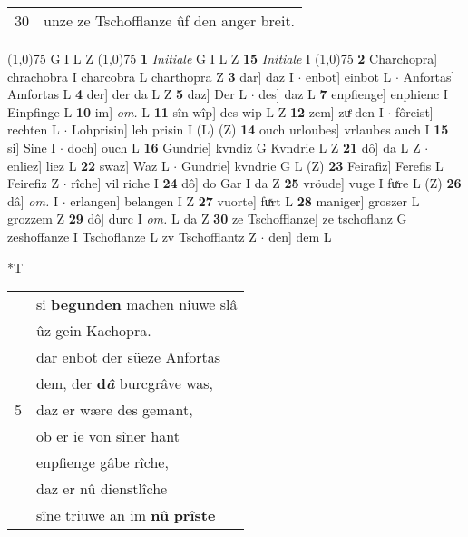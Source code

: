 \documentclass[8pt,a4paper,notitlepage]{article}
\begin{document}
\begin{table}[ht]
\begin{minipage}[t]{0.5\linewidth}
\begin{tabular}{rl}
30 & unze ze Tschofflanze ûf den anger breit.\\ 
\end{tabular}
\scriptsize
\line(1,0){75} \newline
G I L Z \newline
\line(1,0){75} \newline
\textbf{1} \textit{Initiale} G I L Z  \textbf{15} \textit{Initiale} I  \newline
\line(1,0){75} \newline
\textbf{2} Charchopra] chrachobra I charcobra L charthopra Z \textbf{3} dar] daz I  $\cdot$ enbot] einbot L  $\cdot$ Anfortas] Amfortas L \textbf{4} der] der da L Z \textbf{5} daz] Der L  $\cdot$ des] daz L \textbf{7} enpfienge] enphienc I Einpfinge L \textbf{10} im] \textit{om.} L \textbf{11} sîn wîp] des wip L Z \textbf{12} zem] zuͤ den I  $\cdot$ fôreist] rechten L  $\cdot$ Lohprisin] leh prisin I (L) (Z) \textbf{14} ouch urloubes] vrlaubes auch I \textbf{15} si] Sine I  $\cdot$ doch] ouch L \textbf{16} Gundrie] kvndiz G Kvndrie L Z \textbf{21} dô] da L Z  $\cdot$ enliez] liez L \textbf{22} swaz] Waz L  $\cdot$ Gundrie] kvndrie G L (Z) \textbf{23} Feirafiz] Ferefis L Feirefiz Z  $\cdot$ rîche] vil riche I \textbf{24} dô] do Gar I da Z \textbf{25} vröude] vuge I fuͯre L (Z) \textbf{26} dâ] \textit{om.} I  $\cdot$ erlangen] belangen I Z \textbf{27} vuorte] fuͯrt L \textbf{28} maniger] groszer L grozzem Z \textbf{29} dô] durc I \textit{om.} L da Z \textbf{30} ze Tschofflanze] ze tschoflanz G zeshoffanze I Tschoflanze L zv Tschofflantz Z  $\cdot$ den] dem L \newline
\end{minipage}
\hspace{0.5cm}
\begin{minipage}[t]{0.5\linewidth}
\small
\begin{center}*T
\end{center}
\begin{tabular}{rl}
 & si \textbf{begunden} machen niuwe slâ\\ 
 & ûz gein Kachopra.\\ 
 & dar enbot der süeze Anfortas\\ 
 & dem, der \textbf{d\textit{â}} burcgrâve was,\\ 
5 & daz er wære des gemant,\\ 
 & ob er ie von sîner hant\\ 
 & enpfienge gâbe rîche,\\ 
 & daz er nû dienstlîche\\ 
 & sîne triuwe an im \textbf{nû} \textbf{prîste}\\ 

\end{tabular}
\end{minipage}
\end{table}
\end{document}
